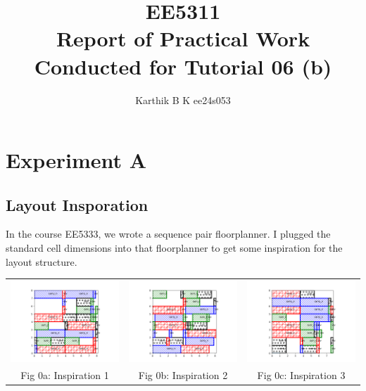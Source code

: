 \documentclass[12pt,a4paper]{article}
\begin{document}
\title{EE5311 \\ Report of Practical Work Conducted for Tutorial 06 (b)}
\author{Karthik B K ee24s053}
\maketitle

\section{Experiment A}
\subsection{Layout Insporation}
In the course EE5333, we wrote a sequence pair floorplanner. I plugged the standard cell dimensions into that floorplanner to get some inspiration for the layout structure.
\begin{center}
    \begin{tabular}{ccc}
     \includegraphics[width=0.32\linewidth]{tut6/reports/media/fp_inspo_1.png} &
     \includegraphics[width=0.32\linewidth]{tut6/reports/media/fp_inspo_2.png} &
     \includegraphics[width=0.32\linewidth]{tut6/reports/media/fp_inspo_3.png} \\
     Fig 0a: Inspiration 1 & Fig 0b: Inspiration 2 & Fig 0c: Inspiration 3
\end{tabular}
\end{center}
\end{document}
